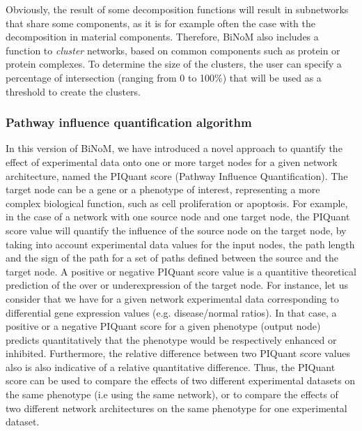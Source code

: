 \documentclass[10pt]{bmc_article}
\newenvironment{bmcformat}{\baselineskip20pt\sloppy\setboolean{publ}{false}}{\baselineskip20pt\sloppy}
\begin{document}
\begin{bmcformat}
Obviously, the result of some decomposition functions will result in subnetworks
that share some components, as it is for example often the case
with the decomposition in material components. Therefore, BiNoM also includes a
function to \emph{cluster} networks, based on common components such as protein
or protein complexes. To determine the size of the clusters, the user can
specify a percentage of intersection (ranging from 0 to 100\%) that will be used
as a threshold to create the clusters.

\subsubsection*{Pathway influence quantification algorithm}

In this version of BiNoM, we have introduced a novel approach to quantify the
effect of experimental data onto one or more target nodes for a given
network architecture, named the PIQuant score (Pathway Influence Quantification).
The target node can be a gene or a phenotype of interest, representing a more complex
biological function, such as cell proliferation or apoptosis.
For example, in the case of a network
with one source node and one target node,
the PIQuant score value will quantify the influence of the source node on the target
node, by taking into account experimental data values for the input nodes,
the path length and the sign of the path for a set of paths defined between the
source and the target node.
A positive or negative PIQuant score value is a quantitive theoretical
prediction of the over or underexpression of
the target node. For instance, let us consider that we have for a given network
experimental data corresponding to differential gene expression values (e.g.
disease/normal ratios).
In that case, a positive or a negative PIQuant score for a given phenotype
(output node) predicts quantitatively
that the phenotype would be respectively enhanced or inhibited. Furthermore, the
relative difference between two PIQuant score values also is also indicative of
a relative quantitative difference. Thus, the PIQuant score can be used to
compare the effects of two different experimental datasets on the same phenotype
(i.e using the same network), or to compare the effects of two different network
architectures on the same phenotype for one experimental dataset.



\end{bmcformat}
\end{document}
